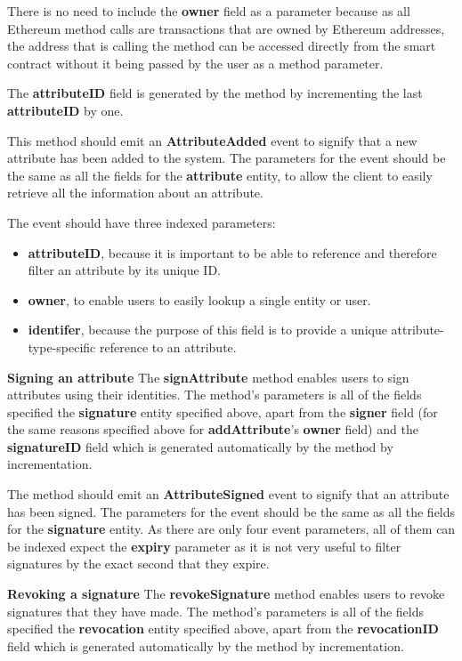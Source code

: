 \documentclass[12pt]{report}
\begin{document}
	There is no need to include the \textbf{owner} field as a parameter because as all Ethereum method calls are transactions that are owned by Ethereum addresses, the address that is calling the method can be accessed directly from the smart contract without it being passed by the user as a method parameter.
	
	The \textbf{attributeID} field is generated by the method by incrementing the last \textbf{attributeID} by one.
	
	This method should emit an \textbf{AttributeAdded} event to signify that a new attribute has been added to the system. The parameters for the event should be the same as all the fields for the \textbf{attribute} entity, to allow the client to easily retrieve all the information about an attribute.
	
	The event should have three indexed parameters:
	\begin{itemize}
		\item \textbf{attributeID}, because it is important to be able to reference and therefore filter an attribute by its unique ID.
		\item \textbf{owner}, to enable users to easily lookup a single entity or user.
		\item \textbf{identifer}, because the purpose of this field is to provide a unique attribute-type-specific reference to an attribute.
	\end{itemize}
	
	\bigskip
	\noindent \textbf{Signing an attribute}\newline
	The \textbf{signAttribute} method enables users to sign attributes using their identities. The method's parameters is all of the fields specified the \textbf{signature} entity specified above, apart from the \textbf{signer} field (for the same reasons specified above for \textbf{addAttribute}'s \textbf{owner} field) and the \textbf{signatureID} field which is generated automatically by the method by incrementation.
	
	The method should emit an \textbf{AttributeSigned} event to signify that an attribute has been signed. The parameters for the event should be the same as all the fields for the \textbf{signature} entity. As there are only four event parameters, all of them can be indexed expect the \textbf{expiry} parameter as it is not very useful to filter signatures by the exact second that they expire.
	
	\bigskip
	\noindent \textbf{Revoking a signature}\newline
	The \textbf{revokeSignature} method enables users to revoke signatures that they have made. The method's parameters is all of the fields specified the \textbf{revocation} entity specified above, apart from the \textbf{revocationID} field which is generated automatically by the method by incrementation.
	
\end{document}
